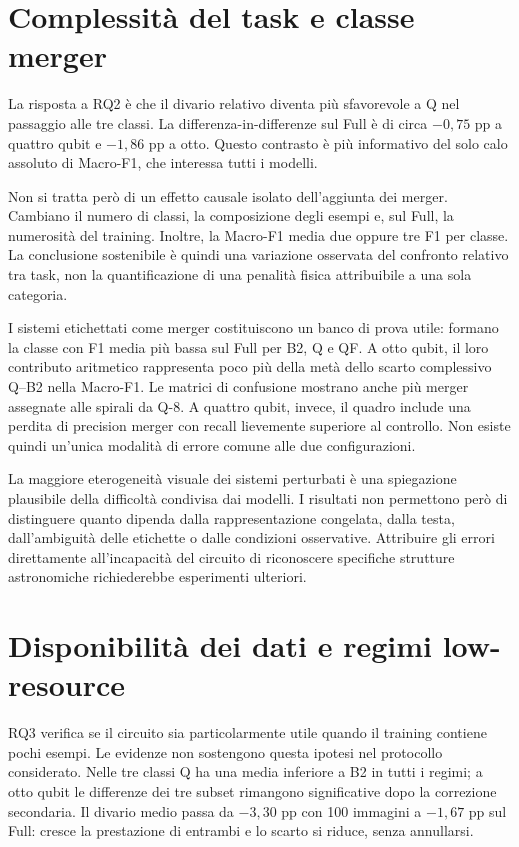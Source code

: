 \section{Complessità del task e classe merger}
\label{sec:disc-rq2}

La risposta a RQ2 è che il divario relativo diventa più sfavorevole
a Q nel passaggio alle tre classi. La differenza-in-differenze sul
Full è di circa \(-0{,}75\) pp a quattro qubit e \(-1{,}86\) pp
a otto. Questo contrasto è più informativo del solo calo assoluto
di Macro-F1, che interessa tutti i modelli.

Non si tratta però di un effetto causale isolato dell'aggiunta dei
merger. Cambiano il numero di classi, la composizione degli esempi
e, sul Full, la numerosità del training. Inoltre, la Macro-F1
media due oppure tre F1 per classe. La conclusione sostenibile è
quindi una variazione osservata del confronto relativo tra task,
non la quantificazione di una penalità fisica attribuibile a una
sola categoria.

I sistemi etichettati come merger costituiscono un banco di prova utile:
formano la classe con F1 media più bassa sul Full per B2, Q e QF. A otto qubit,
il loro contributo aritmetico rappresenta poco più della metà dello
scarto complessivo Q--B2 nella Macro-F1. Le matrici di confusione
mostrano anche più merger assegnate alle spirali da Q-8. A quattro
qubit, invece, il quadro include una perdita di precision merger
con recall lievemente superiore al controllo. Non esiste quindi
un'unica modalità di errore comune alle due configurazioni.

La maggiore eterogeneità visuale dei sistemi perturbati è una
spiegazione plausibile della difficoltà condivisa dai modelli.
I risultati non permettono però di distinguere quanto dipenda dalla
rappresentazione congelata, dalla testa, dall'ambiguità delle etichette
o dalle condizioni osservative. Attribuire gli errori direttamente
all'incapacità del circuito di riconoscere specifiche strutture
astronomiche richiederebbe esperimenti ulteriori.

\section{Disponibilità dei dati e regimi low-resource}
\label{sec:disc-rq3}

RQ3 verifica se il circuito sia particolarmente utile quando il
training contiene pochi esempi. Le evidenze non sostengono questa
ipotesi nel protocollo considerato. Nelle tre classi Q ha una media
inferiore a B2 in tutti i regimi; a otto qubit le differenze dei
tre subset rimangono significative dopo la correzione secondaria.
Il divario medio passa da \(-3{,}30\) pp con 100 immagini a
\(-1{,}67\) pp sul Full: cresce la prestazione di entrambi e lo
scarto si riduce, senza annullarsi.

